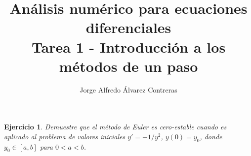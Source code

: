 \documentclass[11pt,letterpaper]{article}
\title{Análisis numérico para ecuaciones diferenciales \\
Tarea 1 - Introducción a los métodos de un paso}
\author{Jorge Alfredo Álvarez Contreras}
\newtheorem{exe}{Ejercicio}
\begin{document}
\maketitle

\begin{exe}
  Demuestre que el método de Euler es cero-estable cuando es aplicado
  al problema de valores iniciales $y'=-1/y^{2}$, $y(0)=y_0$, donde
  $y_0\in[a,b]$ para $0<a<b$.
\end{exe}
\end{document}
